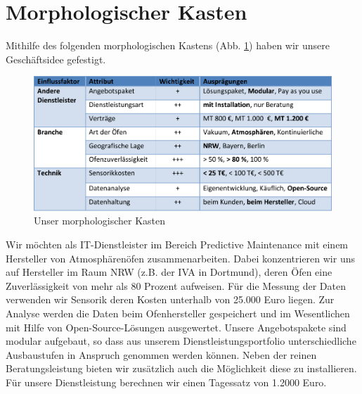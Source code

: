 \section{Morphologischer Kasten}

Mithilfe des folgenden morphologischen Kastens (Abb. \ref{fig:MorphologischerKasten}) haben wir unsere Geschäftsidee gefestigt.

\begin{figure}[H]
\centering
\includegraphics[width=0.9\linewidth]{Bilder/MorphologischerKasten}
\caption{Unser morphologischer Kasten}
\label{fig:MorphologischerKasten}
\end{figure}

Wir möchten als IT-Dienstleister im Bereich Predictive Maintenance mit einem Hersteller von Atmosphärenöfen zusammenarbeiten. Dabei konzentrieren wir uns auf Hersteller im Raum NRW (z.B. der IVA in Dortmund), deren Öfen eine Zuverlässigkeit von mehr als 80 Prozent aufweisen. Für die Messung der Daten verwenden wir Sensorik deren Kosten unterhalb von 25.000 Euro liegen. Zur Analyse werden die Daten beim Ofenhersteller gespeichert und im Wesentlichen mit Hilfe von Open-Source-Lösungen ausgewertet. Unsere Angebotspakete sind modular aufgebaut, so dass aus unserem Dienstleistungsportfolio unterschiedliche Ausbaustufen in Anspruch genommen werden können. Neben der reinen Beratungsleistung bieten wir zusätzlich auch die Möglichkeit diese zu installieren. Für unsere Dienstleistung berechnen wir einen Tagessatz von 1.2000 Euro.
